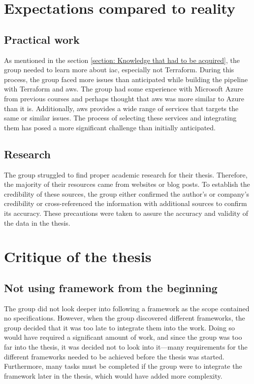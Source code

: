 \section{Expectations compared to reality}
\subsection{Practical work}
As mentioned in the section \ref{section: Knowledge that had to be acquired}, the group needed to learn more about \gls{iac}, especially not Terraform. During this process, the group faced more issues than anticipated while building the pipeline with Terraform and \acrshort{aws}. The group had some experience with Microsoft Azure from previous courses and perhaps thought that \acrshort{aws} was more similar to Azure than it is. Additionally, \acrshort{aws} provides a wide range of services that targets the same or similar issues. The process of selecting these services and integrating them has posed a more significant challenge than initially anticipated. 

\subsection{Research}
The group struggled to find proper academic research for their thesis. Therefore, the majority of their resources came from websites or blog posts. To establish the credibility of these sources, the group either confirmed the author's or company's credibility or cross-referenced the information with additional sources to confirm its accuracy. These precautions were taken to assure the accuracy and validity of the data in the thesis.


\section{Critique of the thesis}

\subsection{Not using framework from the beginning}
The group did not look deeper into following a framework as the scope contained no specifications. However, when the group discovered different frameworks, the group decided that it was too late to integrate them into the work. Doing so would have required a significant amount of work, and since the group was too far into the thesis, it was decided not to look into it—many requirements for the different frameworks needed to be achieved before the thesis was started. Furthermore, many tasks must be completed if the group were to integrate the framework later in the thesis, which would have added more complexity. 

